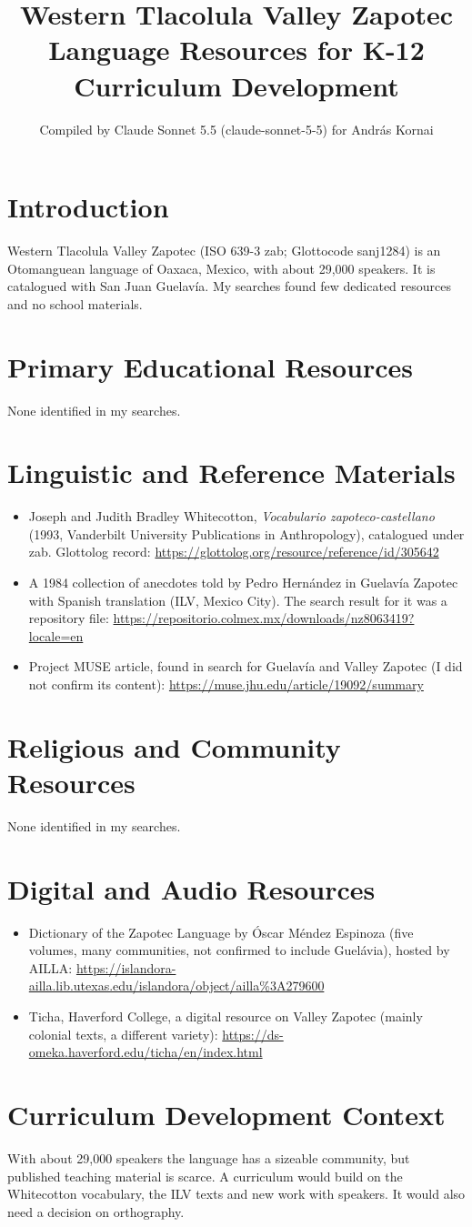 \documentclass[12pt]{article}
\title{Western Tlacolula Valley Zapotec Language Resources for K-12 Curriculum Development}
\author{Compiled by Claude Sonnet 5.5 (claude-sonnet-5-5) for Andr\'as Kornai}
\date{}
\begin{document}
\maketitle

\section{Introduction}
Western Tlacolula Valley Zapotec (ISO 639-3 zab; Glottocode sanj1284) is an Otomanguean language of Oaxaca, Mexico, with about 29,000 speakers. It is catalogued with San Juan Guelav\'ia. My searches found few dedicated resources and no school materials.

\section{Primary Educational Resources}
None identified in my searches.

\section{Linguistic and Reference Materials}
\begin{itemize}
\item Joseph and Judith Bradley Whitecotton, \emph{Vocabulario zapoteco-castellano} (1993, Vanderbilt University Publications in Anthropology), catalogued under zab. Glottolog record: \url{https://glottolog.org/resource/reference/id/305642}
\item A 1984 collection of anecdotes told by Pedro Hern\'andez in Guelav\'ia Zapotec with Spanish translation (ILV, Mexico City). The search result for it was a repository file: \url{https://repositorio.colmex.mx/downloads/nz8063419?locale=en}
\item Project MUSE article, found in search for Guelav\'ia and Valley Zapotec (I did not confirm its content): \url{https://muse.jhu.edu/article/19092/summary}
\end{itemize}

\section{Religious and Community Resources}
None identified in my searches.

\section{Digital and Audio Resources}
\begin{itemize}
\item Dictionary of the Zapotec Language by \'Oscar M\'endez Espinoza (five volumes, many communities, not confirmed to include Guel\'avia), hosted by AILLA: \url{https://islandora-ailla.lib.utexas.edu/islandora/object/ailla%3A279600}
\item Ticha, Haverford College, a digital resource on Valley Zapotec (mainly colonial texts, a different variety): \url{https://ds-omeka.haverford.edu/ticha/en/index.html}
\end{itemize}

\section{Curriculum Development Context}
With about 29,000 speakers the language has a sizeable community, but published teaching material is scarce. A curriculum would build on the Whitecotton vocabulary, the ILV texts and new work with speakers. It would also need a decision on orthography.
\end{document}
